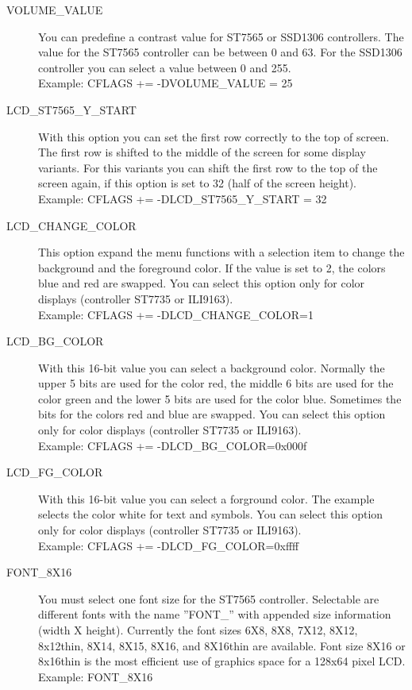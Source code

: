 \begin{description}
  \item[VOLUME\_VALUE] You can predefine a contrast value for ST7565 or SSD1306 controllers.
The value for the ST7565 controller can be between 0 and 63. For the SSD1306 controller you can
select a value between 0 and 255.\\
Example: CFLAGS += -DVOLUME\_VALUE = 25

  \item[LCD\_ST7565\_Y\_START] With this option you can set the first row correctly to the top of screen.
The first row is shifted to the middle of the screen for some display variants.
For this variants you can shift the first row to the top of the screen again,
if this option is set to 32 (half of the screen height).\\
Example: CFLAGS += -DLCD\_ST7565\_Y\_START = 32

  \item[LCD\_CHANGE\_COLOR] This option expand the menu functions with a selection item
to change the background and the foreground color.
If the value is set to 2, the colors blue and red are swapped.
You can select this option only for color displays (controller ST7735 or ILI9163).\\
Example: CFLAGS += -DLCD\_CHANGE\_COLOR=1

 \item[LCD\_BG\_COLOR] With this 16-bit value you can select a background color.
Normally the upper 5 bits are used for the color red, the middle 6 bits are used for the color green
and the lower 5 bits are used for the color blue. Sometimes the bits for the colors red and blue
are swapped.
You can select this option only for color displays (controller ST7735 or ILI9163).\\
Example: CFLAGS += -DLCD\_BG\_COLOR=0x000f

 \item[LCD\_FG\_COLOR] With this 16-bit value you can select a forground color.
The example selects the color white for text and symbols.
You can select this option only for color displays (controller ST7735 or ILI9163).\\
Example: CFLAGS += -DLCD\_FG\_COLOR=0xffff

  \item[FONT\_8X16] You must select one font size for the ST7565 controller.
Selectable are different fonts with the name ''FONT\_'' with appended size information (width X height).
Currently the font sizes 6X8, 8X8, 7X12, 8X12, 8x12thin, 8X14, 8X15, 8X16, and 8X16thin are available.
Font size 8X16 or 8x16thin is the most efficient use of graphics space for a 128x64 pixel LCD.\\
Example: FONT\_8X16


\end{description}
